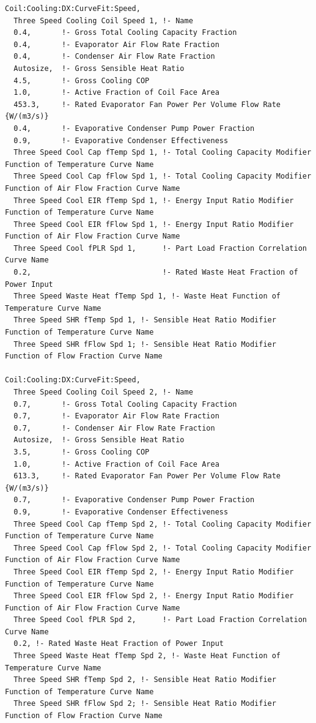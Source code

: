 \begin{lstlisting}
Coil:Cooling:DX:CurveFit:Speed,
  Three Speed Cooling Coil Speed 1, !- Name
  0.4,       !- Gross Total Cooling Capacity Fraction
  0.4,       !- Evaporator Air Flow Rate Fraction
  0.4,       !- Condenser Air Flow Rate Fraction
  Autosize,  !- Gross Sensible Heat Ratio
  4.5,       !- Gross Cooling COP
  1.0,       !- Active Fraction of Coil Face Area
  453.3,     !- Rated Evaporator Fan Power Per Volume Flow Rate {W/(m3/s)}
  0.4,       !- Evaporative Condenser Pump Power Fraction
  0.9,       !- Evaporative Condenser Effectiveness
  Three Speed Cool Cap fTemp Spd 1, !- Total Cooling Capacity Modifier Function of Temperature Curve Name
  Three Speed Cool Cap fFlow Spd 1, !- Total Cooling Capacity Modifier Function of Air Flow Fraction Curve Name
  Three Speed Cool EIR fTemp Spd 1, !- Energy Input Ratio Modifier Function of Temperature Curve Name
  Three Speed Cool EIR fFlow Spd 1, !- Energy Input Ratio Modifier Function of Air Flow Fraction Curve Name
  Three Speed Cool fPLR Spd 1,      !- Part Load Fraction Correlation Curve Name
  0.2,                              !- Rated Waste Heat Fraction of Power Input
  Three Speed Waste Heat fTemp Spd 1, !- Waste Heat Function of Temperature Curve Name
  Three Speed SHR fTemp Spd 1, !- Sensible Heat Ratio Modifier Function of Temperature Curve Name
  Three Speed SHR fFlow Spd 1; !- Sensible Heat Ratio Modifier Function of Flow Fraction Curve Name

Coil:Cooling:DX:CurveFit:Speed,
  Three Speed Cooling Coil Speed 2, !- Name
  0.7,       !- Gross Total Cooling Capacity Fraction
  0.7,       !- Evaporator Air Flow Rate Fraction
  0.7,       !- Condenser Air Flow Rate Fraction
  Autosize,  !- Gross Sensible Heat Ratio
  3.5,       !- Gross Cooling COP
  1.0,       !- Active Fraction of Coil Face Area
  613.3,     !- Rated Evaporator Fan Power Per Volume Flow Rate {W/(m3/s)}
  0.7,       !- Evaporative Condenser Pump Power Fraction
  0.9,       !- Evaporative Condenser Effectiveness
  Three Speed Cool Cap fTemp Spd 2, !- Total Cooling Capacity Modifier Function of Temperature Curve Name
  Three Speed Cool Cap fFlow Spd 2, !- Total Cooling Capacity Modifier Function of Air Flow Fraction Curve Name
  Three Speed Cool EIR fTemp Spd 2, !- Energy Input Ratio Modifier Function of Temperature Curve Name
  Three Speed Cool EIR fFlow Spd 2, !- Energy Input Ratio Modifier Function of Air Flow Fraction Curve Name
  Three Speed Cool fPLR Spd 2,      !- Part Load Fraction Correlation Curve Name
  0.2, !- Rated Waste Heat Fraction of Power Input
  Three Speed Waste Heat fTemp Spd 2, !- Waste Heat Function of Temperature Curve Name
  Three Speed SHR fTemp Spd 2, !- Sensible Heat Ratio Modifier Function of Temperature Curve Name
  Three Speed SHR fFlow Spd 2; !- Sensible Heat Ratio Modifier Function of Flow Fraction Curve Name


\end{lstlisting}

